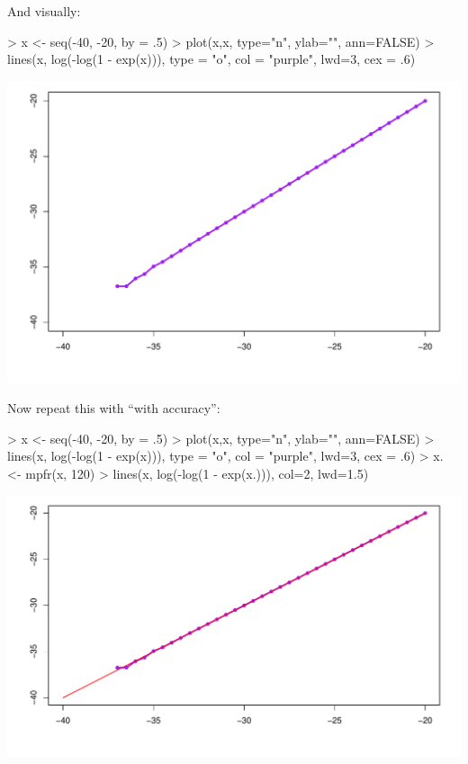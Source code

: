 \begin{frame}[fragile]
And visually:
\begin{Schunk}
\begin{Sinput}
> x <- seq(-40, -20, by = .5)
> plot(x,x, type="n", ylab="", ann=FALSE)
> lines(x, log(-log(1 - exp(x))), type = "o", col = "purple", lwd=3, cex = .6)
\end{Sinput}
\end{Schunk}
\includegraphics{log1exp-plot-log1exp-ex}
\end{frame}

\begin{frame}[fragile]
Now repeat this with ``with accuracy'':
\begin{Schunk}
\begin{Sinput}
> x <- seq(-40, -20, by = .5)
> plot(x,x, type="n", ylab="", ann=FALSE)
> lines(x, log(-log(1 - exp(x))), type = "o", col = "purple", lwd=3, cex = .6)
> x. <- mpfr(x, 120)
> lines(x, log(-log(1 - exp(x.))), col=2, lwd=1.5)
\end{Sinput}
\end{Schunk}
\includegraphics{log1exp-plot-log1exp-mpfr}
\end{frame}



